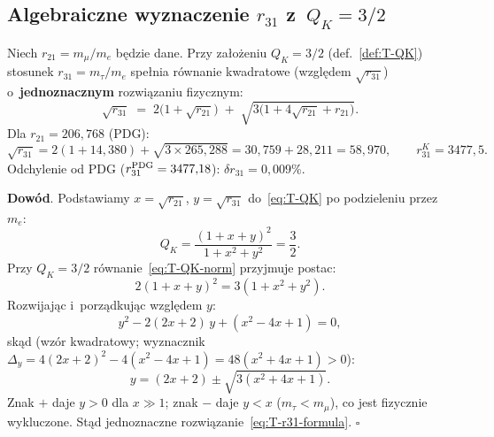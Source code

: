 \subsection{Algebraiczne wyznaczenie $r_{31}$ z~$Q_K = 3/2$}%
\label{app:T-algebra}

\begin{theorem}%
\label{thm:T-r31}
Niech $r_{21} = m_\mu/m_e$ b\k{e}dzie dane.
Przy za\l{}o\.zeniu $Q_K = 3/2$ (def.~\ref{def:T-QK})
stosunek $r_{31} = m_\tau/m_e$ spe\l{}nia r\'ownanie kwadratowe
(wzgl\k{e}dem $\sqrt{r_{31}}$) o~\textbf{jednoznacznym} rozwi\k{a}zaniu
fizycznym:
\begin{equation}\label{eq:T-r31-formula}
  \boxed{\sqrt{r_{31}} \;=\; 2\bigl(1 + \sqrt{r_{21}}\bigr)
    \;+\; \sqrt{3\bigl(1 + 4\sqrt{r_{21}} + r_{21}\bigr)}.}
\end{equation}
Dla $r_{21} = 206{,}768$ (PDG):
\begin{equation}\label{eq:T-r31-num}
  \sqrt{r_{31}}
    = 2(1 + 14{,}380) + \sqrt{3 \times 265{,}288}
    = 30{,}759 + 28{,}211
    = 58{,}970,
  \qquad
  r_{31}^K = 3477{,}5.
\end{equation}
Odchylenie od PDG ($r_{31}^{\rm PDG} = 3477{,}18$):
$\delta r_{31} = 0{,}009\%$.

\textbf{Dow\'od}.
Podstawiamy $x = \sqrt{r_{21}}$, $y = \sqrt{r_{31}}$ do~\eqref{eq:T-QK}
po podzieleniu przez $m_e$:
\begin{equation}\label{eq:T-QK-norm}
  Q_K = \frac{(1 + x + y)^2}{1 + x^2 + y^2} = \frac{3}{2}.
\end{equation}
Przy $Q_K = 3/2$ r\'ownanie~\eqref{eq:T-QK-norm} przyjmuje postac:
\begin{equation}\label{eq:T-quad-raw}
  2(1 + x + y)^2 = 3(1 + x^2 + y^2).
\end{equation}
Rozwijaj\k{a}c i~porz\k{a}dkuj\k{a}c wzgl\k{e}dem $y$:
\begin{equation}\label{eq:T-quad-y}
  y^2 - 2(2x+2)\,y + (x^2 - 4x + 1) = 0,
\end{equation}
sk\k{a}d (wz\'or kwadratowy; wyznacznik
$\Delta_y = 4(2x+2)^2 - 4(x^2-4x+1) = 48(x^2+4x+1) > 0$):
\begin{equation}\label{eq:T-quad-sol}
  y = (2x+2) \pm \sqrt{3(x^2 + 4x + 1)}.
\end{equation}
Znak $+$ daje $y > 0$ dla $x \gg 1$; znak $-$ daje
$y < x$ ($m_\tau < m_\mu$), co jest fizycznie wykluczone.
St\k{a}d jednoznaczne rozwi\k{a}zanie~\eqref{eq:T-r31-formula}.
\hfill$\square$
\end{theorem}

